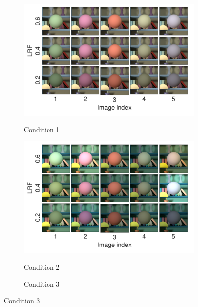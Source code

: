 \documentclass{jov}
\begin{document}
\begin{figure}
\centering
	\begin{subfigure}{0.33 \textwidth}
		\caption{Condition 1}
		\includegraphics[width=\textwidth]{../FiguresDraft5/Figure1/Figure1_b.pdf}
 		\label{fig:backgroundVarying}
	\end{subfigure}
	\begin{subfigure}{0.33 \textwidth}
        \caption{Condition 2}	
        \includegraphics[width=\textwidth]{../FiguresDraft5/Figure5/Figure5_b.pdf}
        \label{fig:targetIlluminantVarying}
    \end{subfigure}
	\begin{subfigure}{0.33 \textwidth}
	\caption{Condition 3}	

\end{subfigure}
\end{figure}
\end{document}
